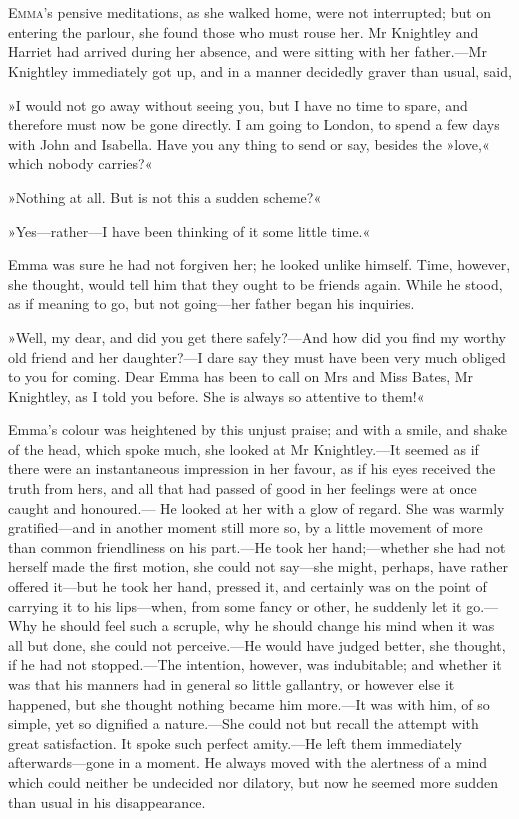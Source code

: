 \chapter[Chapter \thechapter]{}
\lettrine[lines=4,lraise=0.3]{E}{mma}'s pensive meditations, as she walked home, were not interrupted; but on entering the parlour, she found those who must rouse her. Mr Knightley and Harriet had arrived during her absence, and were sitting with her father.—Mr Knightley immediately got up, and in a manner decidedly graver than usual, said,

»I would not go away without seeing you, but I have no time to spare, and therefore must now be gone directly. I am going to London, to spend a few days with John and Isabella. Have you any thing to send or say, besides the »love,« which nobody carries?«

»Nothing at all. But is not this a sudden scheme?«

»Yes—rather—I have been thinking of it some little time.«

Emma was sure he had not forgiven her; he looked unlike himself. Time, however, she thought, would tell him that they ought to be friends again. While he stood, as if meaning to go, but not going—her father began his inquiries.

»Well, my dear, and did you get there safely?—And how did you find my worthy old friend and her daughter?—I dare say they must have been very much obliged to you for coming. Dear Emma has been to call on Mrs and Miss Bates, Mr Knightley, as I told you before. She is always so attentive to them!«

Emma's colour was heightened by this unjust praise; and with a smile, and shake of the head, which spoke much, she looked at Mr Knightley.—It seemed as if there were an instantaneous impression in her favour, as if his eyes received the truth from hers, and all that had passed of good in her feelings were at once caught and honoured.— He looked at her with a glow of regard. She was warmly gratified—and in another moment still more so, by a little movement of more than common friendliness on his part.—He took her hand;—whether she had not herself made the first motion, she could not say—she might, perhaps, have rather offered it—but he took her hand, pressed it, and certainly was on the point of carrying it to his lips—when, from some fancy or other, he suddenly let it go.—Why he should feel such a scruple, why he should change his mind when it was all but done, she could not perceive.—He would have judged better, she thought, if he had not stopped.—The intention, however, was indubitable; and whether it was that his manners had in general so little gallantry, or however else it happened, but she thought nothing became him more.—It was with him, of so simple, yet so dignified a nature.—She could not but recall the attempt with great satisfaction. It spoke such perfect amity.—He left them immediately afterwards—gone in a moment. He always moved with the alertness of a mind which could neither be undecided nor dilatory, but now he seemed more sudden than usual in his disappearance.

